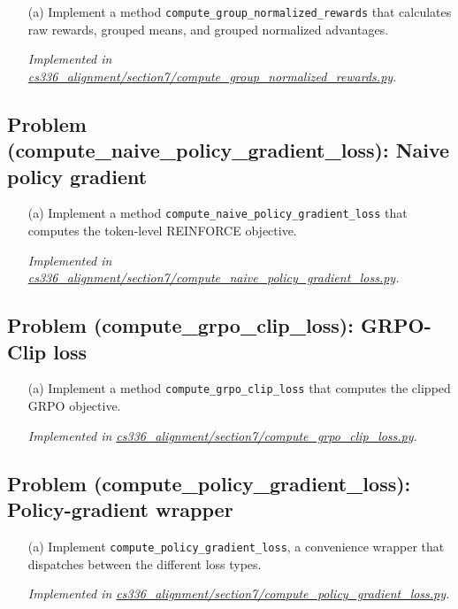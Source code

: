 \documentclass[letterpaper]{article}
\newcommand{\repofile}[2]{\href{https://github.com/echung32/ece405-assignment3-alignment/blob/main/#1}{#2}}
\begin{document}
	\begin{itemize}
		\item[(a)] Implement a method \texttt{compute\_group\_normalized\_rewards} that calculates raw rewards, grouped means, and grouped normalized advantages.
		
		\textit{Implemented in \repofile{cs336_alignment/section7/compute_group_normalized_rewards.py}{cs336\_alignment/section7/compute\_group\_normalized\_rewards.py}.}
		
	\end{itemize}
	
	\subsection{Problem (compute\_naive\_policy\_gradient\_loss): Naive policy gradient}
	
	\begin{itemize}
		\item[(a)] Implement a method \texttt{compute\_naive\_policy\_gradient\_loss} that computes the token-level REINFORCE objective.
		
		\textit{Implemented in \repofile{cs336_alignment/section7/compute_naive_policy_gradient_loss.py}{cs336\_alignment/section7/compute\_naive\_policy\_gradient\_loss.py}.}
		
	\end{itemize}
	
	\subsection{Problem (compute\_grpo\_clip\_loss): GRPO-Clip loss}
	
	\begin{itemize}
		\item[(a)] Implement a method \texttt{compute\_grpo\_clip\_loss} that computes the clipped GRPO objective.
		
		\textit{Implemented in \repofile{cs336_alignment/section7/compute_grpo_clip_loss.py}{cs336\_alignment/section7/compute\_grpo\_clip\_loss.py}.}
		
	\end{itemize}
	
	\subsection{Problem (compute\_policy\_gradient\_loss): Policy-gradient wrapper}
	
	\begin{itemize}
		\item[(a)] Implement \texttt{compute\_policy\_gradient\_loss}, a convenience wrapper that dispatches between the different loss types.
		
		\textit{Implemented in \repofile{cs336_alignment/section7/compute_policy_gradient_loss.py}{cs336\_alignment/section7/compute\_policy\_gradient\_loss.py}.}
		
	\end{itemize}
	
\end{document}
